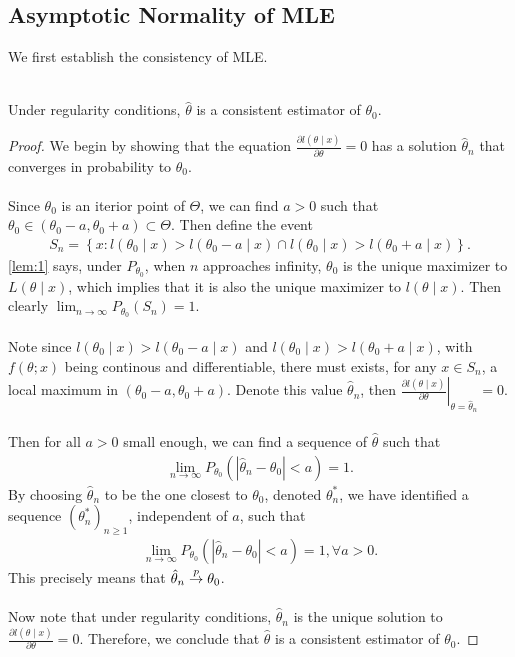 \subsection{Asymptotic Normality of MLE}
We first establish the consistency of MLE.\\\\
\begin{lemma}\label{lem:3}
Under regularity conditions, $\hat{\theta}$ is a consistent estimator of $\theta_0$.
\end{lemma}
\begin{proof}
We begin by showing that the equation $\frac{\partial l(\theta\mid x)}{\partial\theta}=0$ has a solution $\hat{\theta}_n$ that converges in probability to $\theta_0$.\\\\
Since $\theta_0$ is an iterior point of $\Theta$, we can find $a>0$ such that $\theta_0 \in (\theta_0-a, \theta_0+a) \subset \Theta$. Then define the event
\begin{align*}
S_n = \left\{ x: l(\theta_0 \mid x) > l(\theta_0 - a \mid x) \cap l(\theta_0 \mid x) > l(\theta_0 + a \mid x) \right\}.
\end{align*}
\cref{lem:1} says, under $P_{\theta_0}$, when $n$ approaches infinity, $\theta_0$ is the unique maximizer to $L(\theta\mid x)$, which implies that it is also the unique maximizer to $l(\theta\mid x)$. Then clearly $\lim_{n\to\infty}P_{\theta_0}(S_n) = 1$.\\\\
Note since $l(\theta_0\mid x) > l(\theta_0-a\mid x)$ and $l(\theta_0\mid x) > l(\theta_0+a\mid x)$, with $f(\theta; x)$ being continous and differentiable, there must exists, for any $x\in S_n$, a local maximum in $(\theta_0-a, \theta_0+a)$. Denote this value $\hat{\theta}_n$, then $\left.\frac{\partial l(\theta\mid x)}{\partial\theta}\right\vert_{\theta=\hat{\theta}_n}=0$.\\\\
Then for all $a>0$ small enough, we can find a sequence of $\hat{\theta}$ such that
\begin{align*}
\lim_{n\to\infty}P_{\theta_0}\left( |\hat{\theta}_n - \theta_0| < a \right) = 1.
\end{align*}
By choosing $\hat{\theta}_n$ to be the one closest to $\theta_0$, denoted $\theta^*_n$, we have identified a sequence $\left(\theta^*_n\right)_{n\geq1}$, independent of $a$, such that
\begin{align*}
\lim_{n\to\infty}P_{\theta_0}\left( |\hat{\theta}_n - \theta_0| < a \right) = 1, \forall a > 0.
\end{align*}
This precisely means that $\hat{\theta}_n \overset{p}{\rightarrow} \theta_0$.\\\\
Now note that under regularity conditions, $\hat{\theta}_n$ is the unique solution to $\frac{\partial l(\theta\mid x)}{\partial\theta}=0$. Therefore, we conclude that $\hat{\theta}$ is a consistent estimator of $\theta_0$.
\end{proof}
